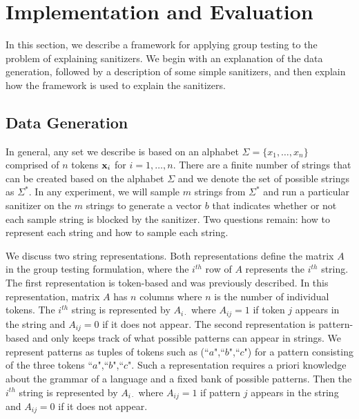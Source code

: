 \section{Implementation and Evaluation}
In this section, we describe a framework for applying group testing to the problem of explaining sanitizers. We begin with an explanation of the data generation, followed by a description of some simple sanitizers, and then explain how the framework is used to explain the sanitizers.

\subsection{Data Generation}
In general, any set we describe is based on an alphabet $\Sigma=\{x_1,\ldots,x_n\}$ comprised of $n$ tokens $\mathbf{x}_i$ for $i=1,\ldots,n$. There are a finite number of strings that can be created based on the alphabet $\Sigma$ and we denote the set of possible strings as $\Sigma^*$. In any experiment, we will sample $m$ strings from $\Sigma^*$ and run a particular sanitizer on the $m$ strings to generate a vector $b$ that indicates whether or not each sample string is blocked by the sanitizer. Two questions remain: how to represent each string and how to sample each string. 

We discuss two string representations. Both representations define the matrix $A$ in the group testing formulation, where the $i^{th}$ row of $A$ represents the $i^{th}$ string. The first representation is token-based and was previously described. In this representation, matrix $A$ has $n$ columns where $n$ is the number of individual tokens. The $i^{th}$ string is represented by $A_{i\cdot}$ where $A_{ij}=1$ if token $j$ appears in the string and $A_{ij}=0$ if it does not appear. The second representation is pattern-based and only keeps track of what possible patterns can appear in strings. We represent patterns as tuples of tokens such as (``$a$",``$b$",``$c$") for a pattern consisting of the three tokens ``$a$",``$b$",``$c$". Such a representation requires a priori knowledge about the grammar of a language and a fixed bank of possible patterns. Then the $i^{th}$ string is represented by $A_{i\cdot}$ where $A_{ij}=1$ if pattern $j$ appears in the string and $A_{ij}=0$ if it does not appear.

